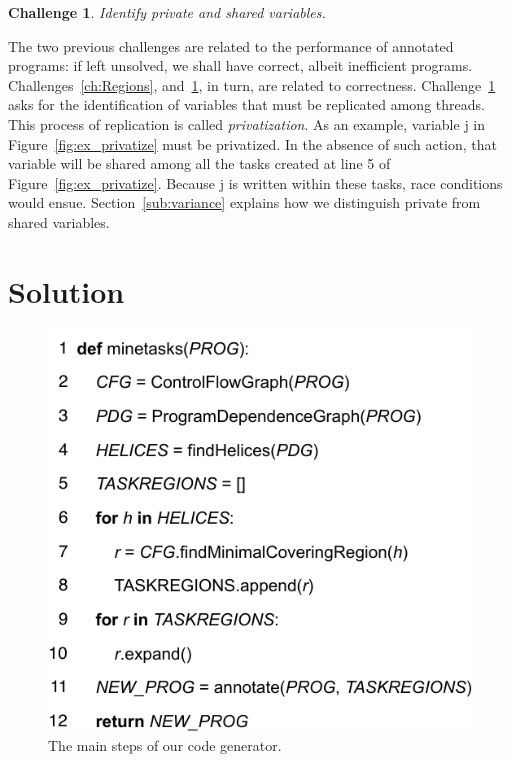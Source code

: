 \documentclass[sigplan,10pt,review,anonymous]{acmart}
\newtheorem{Challenge}{Challenge}[section]
\begin{document}
\begin{Challenge}
\label{ch:privatize}
Identify private and shared variables.
\end{Challenge}

The two previous challenges are related to the performance of annotated
programs: if left unsolved, we shall have correct, albeit inefficient programs.
Challenges~\ref{ch:Regions}, and~\ref{ch:privatize}, in turn, are
related to correctness.
Challenge~\ref{ch:privatize} asks for the identification of variables that
must be replicated among threads.
This process of replication is called {\em privatization}.
As an example, variable \textsf{j} in Figure~\ref{fig:ex_privatize} must
be privatized.
In the absence of such action, that variable will be shared among all the
tasks created at line 5 of Figure~\ref{fig:ex_privatize}.
Because \textsf{j} is written within these tasks, race conditions would
ensue.
Section~\ref{sub:variance} explains how we distinguish private from
shared variables.




\section{Solution}
\label{sec:sol}

\begin{figure}[t!]
\begin{center}
\includegraphics[width=0.9\columnwidth]{images/alg_main}
\caption{The main steps of our code generator.}
\label{fig:alg_main}
\end{center}
\end{figure}
\end{document}
